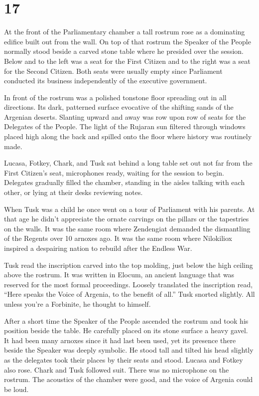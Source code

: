 
\chapter{17}

At the front of the Parliamentary chamber a tall rostrum rose as a dominating edifice built out
from the wall. On top of that rostrum the Speaker of the People normally stood beside a carved
stone table where he presided over the session. Below and to the left was a seat for the First
Citizen and to the right was a seat for the Second Citizen. Both seats were usually empty since
Parliament conducted its business independently of the executive government.

In front of the rostrum was a polished tonstone floor spreading out in all directions. Its dark,
patterned surface evocative of the shifting sands of the Argenian deserts. Slanting upward and
away was row upon row of seats for the Delegates of the People. The light of the Rujaran sun
filtered through windows placed high along the back and spilled onto the floor where history was
routinely made.

Lucasa, Fotkey, Chark, and Tusk sat behind a long table set out not far from the First Citizen's
seat, microphones ready, waiting for the session to begin. Delegates gradually filled the
chamber, standing in the aisles talking with each other, or lying at their desks reviewing
notes.

When Tusk was a child he once went on a tour of Parliament with his parents. At that age he
didn't appreciate the ornate carvings on the pillars or the tapestries on the walls. It was the
same room where Zendengiat demanded the dismantling of the Regents over 10 arnoxes ago. It was
the same room where Nilokiliox inspired a despairing nation to rebuild after the Endless War.

Tusk read the inscription carved into the top molding, just below the high ceiling above the
rostrum. It was written in Elocum, an ancient language that was reserved for the most formal
proceedings. Loosely translated the inscription read, ``Here speaks the Voice of Argenia, to the
benefit of all.'' Tusk snorted slightly. All unless you're a Forbinite, he thought to himself.

After a short time the Speaker of the People ascended the rostrum and took his position beside
the table. He carefully placed on its stone surface a heavy gavel. It had been many arnoxes
since it had last been used, yet its presence there beside the Speaker was deeply symbolic. He
stood tall and tilted his head slightly as the delegates took their places by their seats and
stood. Lucasa and Fotkey also rose. Chark and Tusk followed suit. There was no microphone on the
rostrum. The acoustics of the chamber were good, and the voice of Argenia could be loud.

